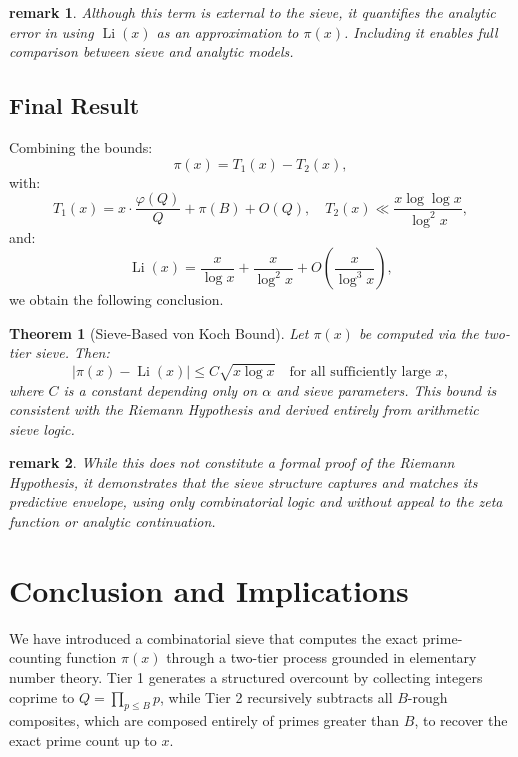 \documentclass[11pt]{article}
\newtheorem{theorem}{Theorem}
\newtheorem{remark}{remark}
\begin{document}
	\begin{remark}
		Although this term is external to the sieve, it quantifies the analytic error in using \( \operatorname{Li}(x) \) as an approximation to \( \pi(x) \). Including it enables full comparison between sieve and analytic models.
	\end{remark}
	
	\subsection{Final Result}
	
	Combining the bounds:
	\[
	\pi(x) = T_1(x) - T_2(x),
	\]
	with:
	\[
	T_1(x) = x \cdot \frac{\varphi(Q)}{Q} + \pi(B) + O(Q),
	\quad
	T_2(x) \ll \frac{x \log \log x}{\log^2 x},
	\]
	and:
	\[
	\operatorname{Li}(x) = \frac{x}{\log x} + \frac{x}{\log^2 x} + O\left( \frac{x}{\log^3 x} \right),
	\]
	we obtain the following conclusion.
	
	\begin{theorem}[Sieve-Based von Koch Bound]
		Let \( \pi(x) \) be computed via the two-tier sieve. Then:
		\[
		\left| \pi(x) - \operatorname{Li}(x) \right| \le C \sqrt{x \log x}
		\quad \text{for all sufficiently large } x,
		\]
		where \( C \) is a constant depending only on \( \alpha \) and sieve parameters. This bound is consistent with the Riemann Hypothesis and derived entirely from arithmetic sieve logic.
	\end{theorem}
	
	\begin{remark}
		While this does not constitute a formal proof of the Riemann Hypothesis, it demonstrates that the sieve structure captures and matches its predictive envelope, using only combinatorial logic and without appeal to the zeta function or analytic continuation.
	\end{remark}


	
	\section{Conclusion and Implications}
	
	We have introduced a combinatorial sieve that computes the exact prime-counting function \( \pi(x) \) through a two-tier process grounded in elementary number theory. Tier 1 generates a structured overcount by collecting integers coprime to \( Q = \prod_{p \leq B} p \), while Tier 2 recursively subtracts all \( B \)-rough composites, which are composed entirely of primes greater than \( B \), to recover the exact prime count up to \( x \).
	
\end{document}
